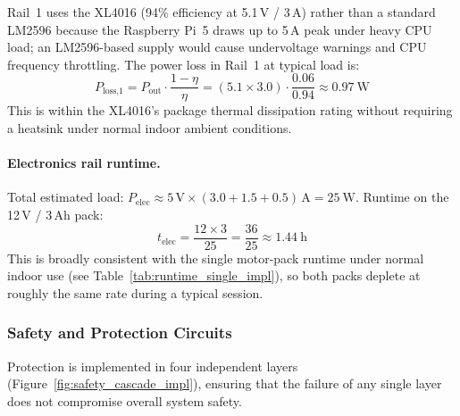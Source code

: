 \documentclass[12pt,a4paper]{report}
\begin{document}
Rail~1 uses the XL4016 (94\% efficiency at 5.1\,V / 3\,A) rather than a
standard LM2596 because the Raspberry Pi~5 draws up to 5\,A peak under
heavy CPU load; an LM2596-based supply would cause undervoltage warnings and
CPU frequency throttling. The power loss in Rail~1 at typical load is:
\begin{equation}
  P_\text{loss,1} = P_\text{out} \cdot \frac{1-\eta}{\eta}
  = (5.1 \times 3.0) \cdot \frac{0.06}{0.94} \approx \SI{0.97}{\watt}
\end{equation}
This is within the XL4016's package thermal dissipation rating without
requiring a heatsink under normal indoor ambient conditions.

\paragraph{Electronics rail runtime.}
Total estimated load: $P_\text{elec} \approx 5\,\text{V} \times
(3.0 + 1.5 + 0.5)\,\text{A} = \SI{25}{\watt}$. Runtime on the 12\,V / 3\,Ah pack:
\begin{equation}
  t_\text{elec} = \frac{12 \times 3}{25} = \frac{36}{25} \approx \SI{1.44}{\hour}
\end{equation}
This is broadly consistent with the single motor-pack runtime under normal
indoor use (see Table~\ref{tab:runtime_single_impl}), so both packs deplete at
roughly the same rate during a typical session.

\subsubsection{Safety and Protection Circuits}
\label{subsec:safety_circuits_impl}

Protection is implemented in four independent layers
(Figure~\ref{fig:safety_cascade_impl}), ensuring that the failure of any single
layer does not compromise overall system safety.
\end{document}
